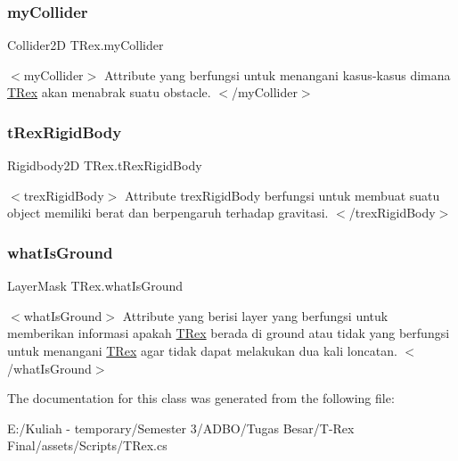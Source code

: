 \subsubsection{\texorpdfstring{my\+Collider}{myCollider}}
{\footnotesize\ttfamily Collider2D T\+Rex.\+my\+Collider\hspace{0.3cm}{\ttfamily [private]}}

$<$my\+Collider$>$ Attribute yang berfungsi untuk menangani kasus-\/kasus dimana \hyperlink{class_t_rex}{T\+Rex} akan menabrak suatu obstacle. $<$/my\+Collider$>$ \hypertarget{class_t_rex_afe1565632a661b2b0141b23ff2c26494}{}\label{class_t_rex_afe1565632a661b2b0141b23ff2c26494} 
\subsubsection{\texorpdfstring{t\+Rex\+Rigid\+Body}{tRexRigidBody}}
{\footnotesize\ttfamily Rigidbody2D T\+Rex.\+t\+Rex\+Rigid\+Body\hspace{0.3cm}{\ttfamily [private]}}

$<$trex\+Rigid\+Body$>$ Attribute trex\+Rigid\+Body berfungsi untuk membuat suatu object memiliki berat dan berpengaruh terhadap gravitasi. $<$/trex\+Rigid\+Body$>$ \hypertarget{class_t_rex_a91eb9e9165522f0f231a8e34f56d5919}{}\label{class_t_rex_a91eb9e9165522f0f231a8e34f56d5919} 
\subsubsection{\texorpdfstring{what\+Is\+Ground}{whatIsGround}}
{\footnotesize\ttfamily Layer\+Mask T\+Rex.\+what\+Is\+Ground}

$<$what\+Is\+Ground$>$ Attribute yang berisi layer yang berfungsi untuk memberikan informasi apakah \hyperlink{class_t_rex}{T\+Rex} berada di ground atau tidak yang berfungsi untuk menangani \hyperlink{class_t_rex}{T\+Rex} agar tidak dapat melakukan dua kali loncatan. $<$/what\+Is\+Ground$>$ 

The documentation for this class was generated from the following file\+:\begin{DoxyCompactItemize}
\item 
E\+:/\+Kuliah -\/ temporary/\+Semester 3/\+A\+D\+B\+O/\+Tugas Besar/\+T-\/\+Rex Final/assets/\+Scripts/T\+Rex.\+cs\end{DoxyCompactItemize}
